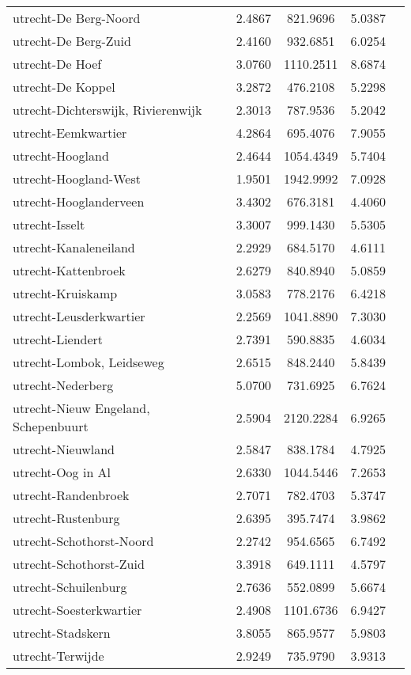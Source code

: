 \begin{longtable}{llccc}
utrecht-De Berg-Noord & 2.4867 & 821.9696 & 5.0387 \\
utrecht-De Berg-Zuid & 2.4160 & 932.6851 & 6.0254 \\
utrecht-De Hoef & 3.0760 & 1110.2511 & 8.6874 \\
utrecht-De Koppel & 3.2872 & 476.2108 & 5.2298 \\
utrecht-Dichterswijk, Rivierenwijk & 2.3013 & 787.9536 & 5.2042 \\
utrecht-Eemkwartier & 4.2864 & 695.4076 & 7.9055 \\
utrecht-Hoogland & 2.4644 & 1054.4349 & 5.7404 \\
utrecht-Hoogland-West & 1.9501 & 1942.9992 & 7.0928 \\
utrecht-Hooglanderveen & 3.4302 & 676.3181 & 4.4060 \\
utrecht-Isselt & 3.3007 & 999.1430 & 5.5305 \\
utrecht-Kanaleneiland & 2.2929 & 684.5170 & 4.6111 \\
utrecht-Kattenbroek & 2.6279 & 840.8940 & 5.0859 \\
utrecht-Kruiskamp & 3.0583 & 778.2176 & 6.4218 \\
utrecht-Leusderkwartier & 2.2569 & 1041.8890 & 7.3030 \\
utrecht-Liendert & 2.7391 & 590.8835 & 4.6034 \\
utrecht-Lombok, Leidseweg & 2.6515 & 848.2440 & 5.8439 \\
utrecht-Nederberg & 5.0700 & 731.6925 & 6.7624 \\
utrecht-Nieuw Engeland, Schepenbuurt & 2.5904 & 2120.2284 & 6.9265 \\
utrecht-Nieuwland & 2.5847 & 838.1784 & 4.7925 \\
utrecht-Oog in Al & 2.6330 & 1044.5446 & 7.2653 \\
utrecht-Randenbroek & 2.7071 & 782.4703 & 5.3747 \\
utrecht-Rustenburg & 2.6395 & 395.7474 & 3.9862 \\
utrecht-Schothorst-Noord & 2.2742 & 954.6565 & 6.7492 \\
utrecht-Schothorst-Zuid & 3.3918 & 649.1111 & 4.5797 \\
utrecht-Schuilenburg & 2.7636 & 552.0899 & 5.6674 \\
utrecht-Soesterkwartier & 2.4908 & 1101.6736 & 6.9427 \\
utrecht-Stadskern & 3.8055 & 865.9577 & 5.9803 \\
utrecht-Terwijde & 2.9249 & 735.9790 & 3.9313 \\

\end{longtable}
